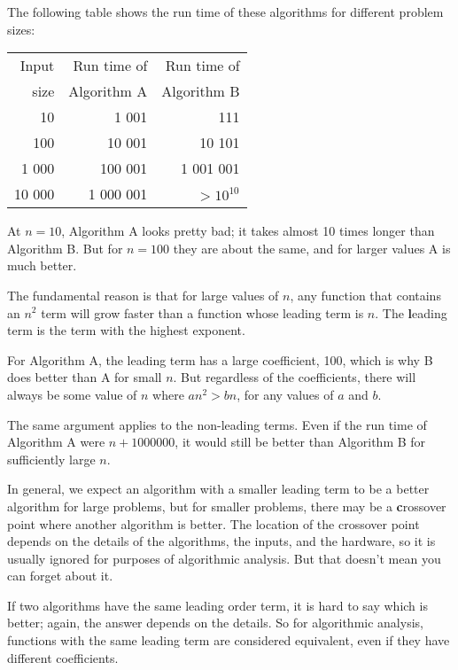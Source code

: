 \documentclass[
DIV=11,
fontsize=13,
twoside,
headinclude=false,
titlepage=firstiscover,
abstract=true,
headsepline=true,
footsepline=true,
chapterprefix=true, %
headings=big,
bibliography=totoc,%
captions=tableheading
]{scrbook}
\theoremstyle{definition}
\begin{document}
The following table shows the run time of these algorithms
for different problem sizes:

\begin{tabular}{|r|r|r|}
\hline
Input     &   Run time of     & Run time of \\
size      &   Algorithm A     & Algorithm B \\
\hline
10        &   1 001           & 111         \\
100       &   10 001          & 10 101         \\
1 000     &   100 001         & 1 001 001         \\
10 000    &   1 000 001       & $> 10^{10}$         \\
\hline
\end{tabular}

At $n=10$, Algorithm A looks pretty bad; it takes almost 10 times
longer than Algorithm B.  But for $n=100$ they are about the same, and
for larger values A is much better.

The fundamental reason is that for large values of $n$, any function
that contains an $n^2$ term will grow faster than a function whose
leading term is $n$.  The {\textbf leading term} is the term with the
highest exponent.

For Algorithm A, the leading term has a large coefficient, 100, which
is why B does better than A for small $n$.  But regardless of the
coefficients, there will always be some value of $n$ where
$a n^2 > b n$, for any values of $a$ and $b$.

The same argument applies to the non-leading terms.  Even if the run
time of Algorithm A were $n+1000000$, it would still be better than
Algorithm B for sufficiently large $n$.

In general, we expect an algorithm with a smaller leading term to be a
better algorithm for large problems, but for smaller problems, there
may be a {\textbf crossover point} where another algorithm is better.  The
location of the crossover point depends on the details of the
algorithms, the inputs, and the hardware, so it is usually ignored for
purposes of algorithmic analysis.  But that doesn't mean you can forget
about it.

If two algorithms have the same leading order term, it is hard to say
which is better; again, the answer depends on the details.  So for
algorithmic analysis, functions with the same leading term
are considered equivalent, even if they have different coefficients.
\end{document}
